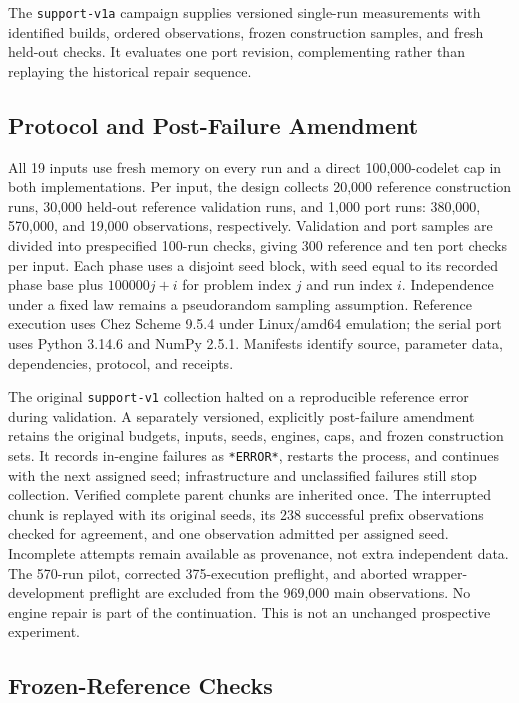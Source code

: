 \documentclass[10pt,letterpaper]{article}
\begin{document}
The \texttt{support-v1a} campaign supplies versioned single-run measurements with
identified builds, ordered observations, frozen construction samples, and fresh held-out
checks. It evaluates one port revision, complementing rather than replaying the historical
repair sequence.

\subsection{Protocol and Post-Failure Amendment}\label{sec:single-protocol}

All 19 inputs use fresh memory on every run and a direct 100,000-codelet cap in both
implementations. Per input, the design collects 20,000 reference construction runs, 30,000
held-out reference validation runs, and 1,000 port runs: 380,000, 570,000, and 19,000
observations, respectively. Validation and port samples are divided into prespecified
100-run checks, giving 300 reference and ten port checks per input. Each phase uses a
disjoint seed block, with seed equal to its recorded phase base plus \(100000j+i\) for
problem index \(j\) and run index \(i\). Independence under a fixed law remains a
pseudorandom sampling assumption. Reference execution uses Chez Scheme 9.5.4 under
Linux/amd64 emulation; the serial port uses Python 3.14.6 and NumPy 2.5.1. Manifests
identify source, parameter data, dependencies, protocol, and receipts.

The original \texttt{support-v1} collection halted on a reproducible reference error
during validation. A separately versioned, explicitly post-failure amendment retains the
original budgets, inputs, seeds, engines, caps, and frozen construction sets. It records
in-engine failures as \texttt{*ERROR*}, restarts the process, and continues with the next
assigned seed; infrastructure and unclassified failures still stop collection. Verified
complete parent chunks are inherited once. The interrupted chunk is replayed with its
original seeds, its 238 successful prefix observations checked for agreement, and one
observation admitted per assigned seed. Incomplete attempts remain available as
provenance, not extra independent data. The 570-run pilot, corrected 375-execution
preflight, and aborted wrapper-development preflight are excluded from the 969,000 main
observations. No engine repair is part of the continuation. This is not an unchanged
prospective experiment.

\subsection{Frozen-Reference Checks}\label{sec:single-results}
\end{document}
